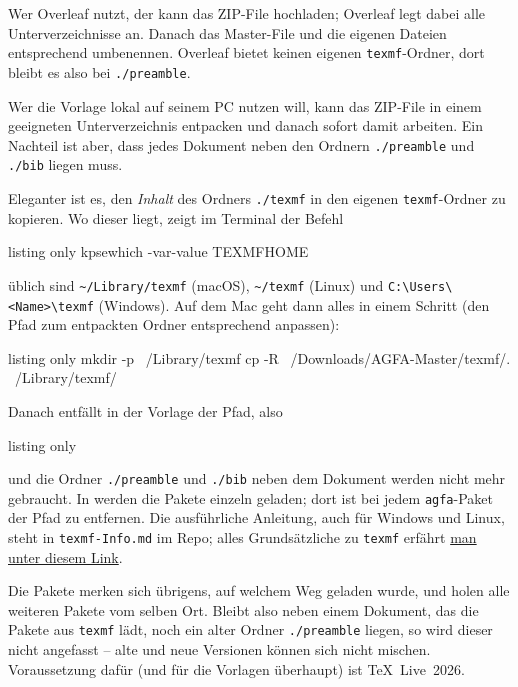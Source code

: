 %
Wer Overleaf nutzt, der kann das ZIP-File hochladen; Overleaf legt dabei alle Unterverzeichnisse an.
Danach das Master-File und die eigenen Dateien entsprechend umbenennen.
Overleaf bietet keinen eigenen \texttt{texmf}-Ordner, dort bleibt es also bei \texttt{./preamble}.

Wer die Vorlage lokal auf seinem PC nutzen will, kann das ZIP-File in einem geeigneten Unterverzeichnis entpacken und danach sofort damit arbeiten.
Ein Nachteil ist aber, dass jedes Dokument neben den Ordnern \texttt{./preamble} und \texttt{./bib} liegen muss.

Eleganter ist es, den \emph{Inhalt} des Ordners \texttt{./texmf} in den eigenen \texttt{texmf}-Ordner zu kopieren.
Wo dieser liegt, zeigt im Terminal der Befehl
%
\begin{tcblisting}{listing only}
kpsewhich -var-value TEXMFHOME
\end{tcblisting}
%
üblich sind \verb|~/Library/texmf| (macOS), \verb|~/texmf| (Linux) und \verb|C:\Users\<Name>\texmf| (Windows).
Auf dem Mac geht dann alles in einem Schritt (den Pfad zum entpackten Ordner entsprechend anpassen):
%
\begin{tcblisting}{listing only}
mkdir -p ~/Library/texmf
cp -R ~/Downloads/AGFA-Master/texmf/. ~/Library/texmf/
\end{tcblisting}
%
Danach entfällt in der Vorlage der Pfad, also
%
\begin{tcblisting}{listing only}
\usepackage{agfa-art}          %
\end{tcblisting}
%
und die Ordner \texttt{./preamble} und \texttt{./bib} neben dem Dokument werden nicht mehr gebraucht.
In  werden die Pakete einzeln geladen; dort ist bei jedem \texttt{agfa}-Paket der Pfad zu entfernen.
Die ausführliche Anleitung, auch für Windows und Linux, steht in \texttt{texmf-Info.md} im Repo; alles Grundsätzliche zu \texttt{texmf} erfährt \href{https://tex.stackexchange.com/questions/420620/what-is-texmf-and-what-is-its-relation-to-tex}{man unter diesem Link}.

Die Pakete merken sich übrigens, auf welchem Weg  geladen wurde, und holen alle weiteren Pakete vom selben Ort.
Bleibt also neben einem Dokument, das die Pakete aus \texttt{texmf} lädt, noch ein alter Ordner \texttt{./preamble} liegen, so wird dieser nicht angefasst -- alte und neue Versionen können sich nicht mischen.
Voraussetzung dafür (und für die Vorlagen überhaupt) ist \TeX~Live~2026.
